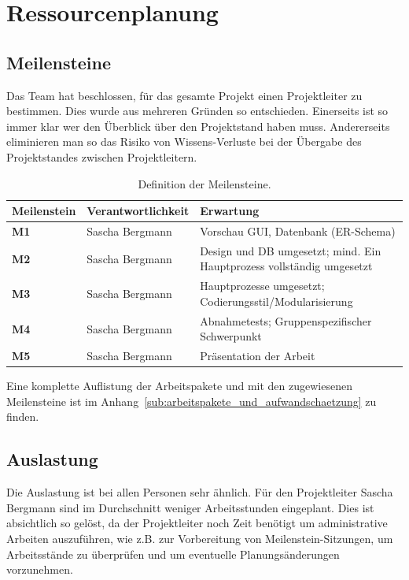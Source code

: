 \section{Ressourcenplanung}
\subsection{Meilensteine}
Das Team hat beschlossen, für das gesamte Projekt einen Projektleiter zu bestimmen. Dies wurde aus mehreren Gründen so entschieden.
Einerseits ist so immer klar wer den Überblick über den Projektstand haben muss. Andererseits eliminieren man so das Risiko von Wissens-Verluste bei der Übergabe des Projektstandes zwischen Projektleitern.\\

\begin{table}[H]
\centering
\begin{tabularx}{\textwidth-1cm}{|l|l|X|} \hline
\textbf{Meilenstein}	& \textbf{Verantwortlichkeit} &	\textbf{Erwartung} \\ \hline
\textbf{M1}	&Sascha Bergmann	&Vorschau GUI, Datenbank (ER-Schema) \\  \hline
\textbf{M2}	&Sascha Bergmann	&Design und DB umgesetzt; mind. Ein Hauptprozess vollständig umgesetzt \\ \hline
\textbf{M3}	&Sascha Bergmann	&Hauptprozesse umgesetzt; Codierungsstil/Modularisierung \\ \hline
\textbf{M4}	&Sascha Bergmann	&Abnahmetests; Gruppenspezifischer Schwerpunkt \\ \hline
\textbf{M5}	&Sascha Bergmann	&Präsentation der Arbeit \\ \hline
\end{tabularx}
\caption{Definition der Meilensteine.}
\end{table}

Eine komplette Auflistung der Arbeitspakete und mit den zugewiesenen Meilensteine ist im Anhang~\ref{sub:arbeitspakete_und_aufwandschaetzung} zu finden.  

\clearpage
\subsection{Auslastung}
Die Auslastung ist bei allen Personen sehr ähnlich. Für den Projektleiter Sascha Bergmann sind im Durchschnitt weniger Arbeitsstunden eingeplant. Dies ist absichtlich so gelöst, da der Projektleiter noch Zeit benötigt um administrative Arbeiten auszuführen, wie z.B. zur Vorbereitung von Meilenstein-Sitzungen, um Arbeitsstände zu überprüfen und um eventuelle Planungsänderungen vorzunehmen.

